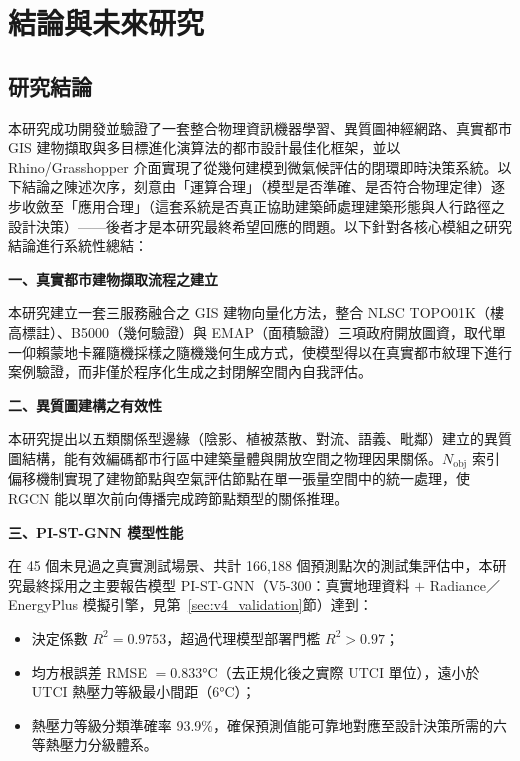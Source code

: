 \chapter{結論與未來研究}
\label{chapter:conclusion}

\section{研究結論}
\label{sec:conclusions}

本研究成功開發並驗證了一套整合物理資訊機器學習、異質圖神經網路、真實都市 GIS 建物擷取與多目標進化演算法的都市設計最佳化框架，並以 Rhino/Grasshopper 介面實現了從幾何建模到微氣候評估的閉環即時決策系統。以下結論之陳述次序，刻意由「運算合理」（模型是否準確、是否符合物理定律）逐步收斂至「應用合理」（這套系統是否真正協助建築師處理建築形態與人行路徑之設計決策）——後者才是本研究最終希望回應的問題。以下針對各核心模組之研究結論進行系統性總結：

\noindent\textbf{一、真實都市建物擷取流程之建立}

本研究建立一套三服務融合之 GIS 建物向量化方法，整合 NLSC TOPO01K（樓高標註）、B5000（幾何驗證）與 EMAP（面積驗證）三項政府開放圖資，取代單一仰賴蒙地卡羅隨機採樣之隨機幾何生成方式，使模型得以在真實都市紋理下進行案例驗證，而非僅於程序化生成之封閉解空間內自我評估。

\noindent\textbf{二、異質圖建構之有效性}

本研究提出以五類關係型邊緣（陰影、植被蒸散、對流、語義、毗鄰）建立的異質圖結構，能有效編碼都市行區中建築量體與開放空間之物理因果關係。$N_{\text{obj}}$ 索引偏移機制實現了建物節點與空氣評估節點在單一張量空間中的統一處理，使 RGCN 能以單次前向傳播完成跨節點類型的關係推理。

\noindent\textbf{三、PI-ST-GNN 模型性能}

在 45 個未見過之真實測試場景、共計 166,188 個預測點次的測試集評估中，本研究最終採用之主要報告模型 PI-ST-GNN（V5-300：真實地理資料 $+$ Radiance／EnergyPlus 模擬引擎，見第~\ref{sec:v4_validation}節）達到：
\begin{itemize}
    \item 決定係數 $R^2 = 0.9753$，超過代理模型部署門檻 $R^2 > 0.97$；
    \item 均方根誤差 RMSE $= 0.833°\text{C}$（去正規化後之實際 UTCI 單位），遠小於 UTCI 熱壓力等級最小間距（$6°\text{C}$）；
    \item 熱壓力等級分類準確率 93.9\%，確保預測值能可靠地對應至設計決策所需的六等熱壓力分級體系。
\end{itemize}

